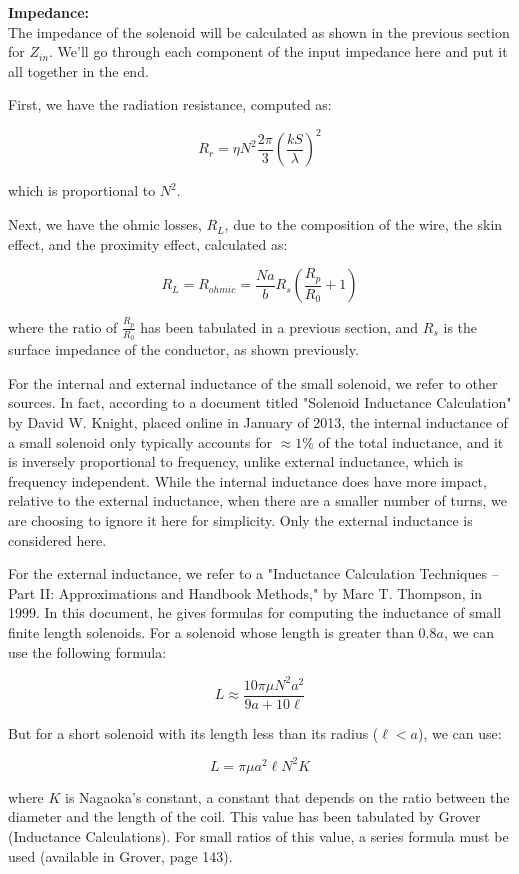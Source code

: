 \documentclass[12pt,onecolumn,titlepage]{article}
\begin{document}
{\bf{Impedance:}} \\
\indent The impedance of the solenoid will be calculated as shown in the previous section for $Z_{in}$. We'll go through each component of the input impedance here and put it all together in the end.

First, we have the radiation resistance, computed as:

\[R_r = \eta N^2 \frac{2\pi}{3} \left( \frac{kS}{\lambda} \right)^2 \]

which is proportional to $N^2$.

Next, we have the ohmic losses, $R_L$, due to the composition of the wire, the skin effect, and the proximity effect, calculated as:

\[R_L = R_{ohmic} = \frac{Na}{b} R_s \left( \frac{R_p}{R_0} + 1 \right) \]

where the ratio of $\frac{R_p}{R_0}$ has been tabulated in a previous section, and $R_s$ is the surface impedance of the conductor, as shown previously. 

For the internal and external inductance of the small solenoid, we refer to other sources. In fact, according to a document titled "Solenoid Inductance Calculation" by David W. Knight, placed online in January of 2013, the internal inductance of a small solenoid only typically accounts for $\approx 1\%$ of the total inductance, and it is inversely proportional to frequency, unlike external inductance, which is frequency independent. While the internal inductance does have more impact, relative to the external inductance, when there are a smaller number of turns, we are choosing to ignore it here for simplicity. Only the external inductance is considered here.

For the external inductance, we refer to a "Inductance Calculation Techniques -- Part II: Approximations and Handbook Methods," by Marc T. Thompson, in 1999. In this document, he gives formulas for computing the inductance of small finite length solenoids. For a solenoid whose length is greater than $0.8a$, we can use the following formula:

\[L \approx \frac{10 \pi \mu N^2 a^2}{9a + 10\ell} \]

But for a short solenoid with its length less than its radius ($\ell < a$), we can use:

\[L = \pi \mu a^2 \ell N^2 K \]

where $K$ is Nagaoka's constant, a constant that depends on the ratio between the diameter and the length of the coil. This value has been tabulated by Grover (Inductance Calculations). For small ratios of this value, a series formula must be used (available in Grover, page 143). \\
\end{document}
